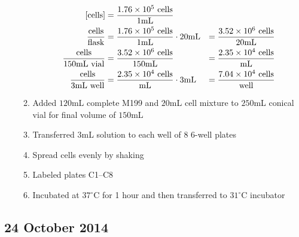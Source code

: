 \begin{enumerate}
\begin{enumerate}
				\begin{align*}
				\text{[cells]} &= \frac{1.76\times 10^{5}\text{ cells}}{1\text{mL}} \\
				\frac{\text{cells}}{\text{flask}} &= \frac{1.76\times 10^{5}\text{ cells}}{1\text{mL}} \cdot 20\text{mL} &= \frac{3.52\times 10^{6}\text{ cells}}{20\text{mL}}\\
				\frac{\text{cells}}{150\text{mL vial}} &= \frac{3.52\times 10^{6}\text{ cells}}{150\text{mL}} &= \frac{2.35\times 10^{4}\text{ cells}}{\text{mL}}\\
				\frac{\text{cells}}{3\text{mL well}} &= \frac{2.35\times 10^{4}\text{ cells}}{\text{mL}} \cdot 3\text{mL} &= \frac{7.04\times 10^{4}\text{ cells}}{\text{well}}\\
				\end{align*}
			\item Added $120$mL complete M199 and $20$mL cell mixture to $250$mL conical vial for final volume of $150$mL
			\item Transferred $3$mL solution to each well of 8 6-well plates
			\item Spread cells evenly by shaking
			\item Labeled plates C1--C8
			\item Incubated at $37^{\circ}$C for 1 hour and then transferred to $31^{\circ}$C incubator
		\end{enumerate}
\end{enumerate}

\subsection*{24 October 2014}

